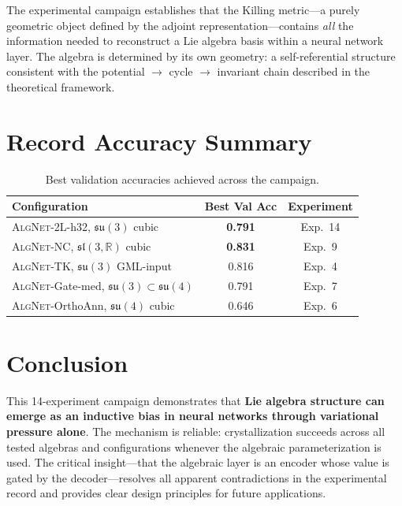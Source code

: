 \documentclass[11pt,a4paper]{article}
\newcommand{\fksu}{\mathfrak{su}}
\newcommand{\fksl}{\mathfrak{sl}}
\newcommand{\RR}{\mathbb{R}}
\newcommand{\AlgNet}{\textsc{AlgNet}}
\theoremstyle{definition}
\begin{document}
The experimental campaign establishes that the Killing metric---a purely 
geometric object defined by the adjoint representation---contains 
\emph{all} the information needed to reconstruct a Lie algebra basis 
within a neural network layer. The algebra is determined by its own 
geometry: a self-referential structure consistent with the 
potential $\to$ cycle $\to$ invariant chain described in the theoretical 
framework.


\section{Record Accuracy Summary}
\label{sec:records}

\begin{table}[H]
\centering
\caption{Best validation accuracies achieved across the campaign.}
\label{tab:records}
\begin{tabular}{lcc}
\toprule
Configuration & Best Val Acc & Experiment \\
\midrule
\AlgNet{}-2L-h32, $\fksu(3)$ cubic    & \textbf{0.791} & Exp.~14 \\
\AlgNet{}-NC, $\fksl(3,\RR)$ cubic    & \textbf{0.831} & Exp.~9 \\
\AlgNet{}-TK, $\fksu(3)$ GML-input    & 0.816          & Exp.~4 \\
\AlgNet{}-Gate-med, $\fksu(3) \subset \fksu(4)$ & 0.791 & Exp.~7 \\
\AlgNet{}-OrthoAnn, $\fksu(4)$ cubic  & 0.646          & Exp.~6 \\
\bottomrule
\end{tabular}
\end{table}


\section{Conclusion}
\label{sec:conclusion}

This 14-experiment campaign demonstrates that \textbf{Lie algebra 
structure can emerge as an inductive bias in neural networks through 
variational pressure alone}. The mechanism is reliable: crystallization 
succeeds across all tested algebras and configurations whenever the 
algebraic parameterization is used. The critical insight---that the 
algebraic layer is an encoder whose value is gated by the 
decoder---resolves all apparent contradictions in the experimental 
record and provides clear design principles for future applications.
\end{document}

